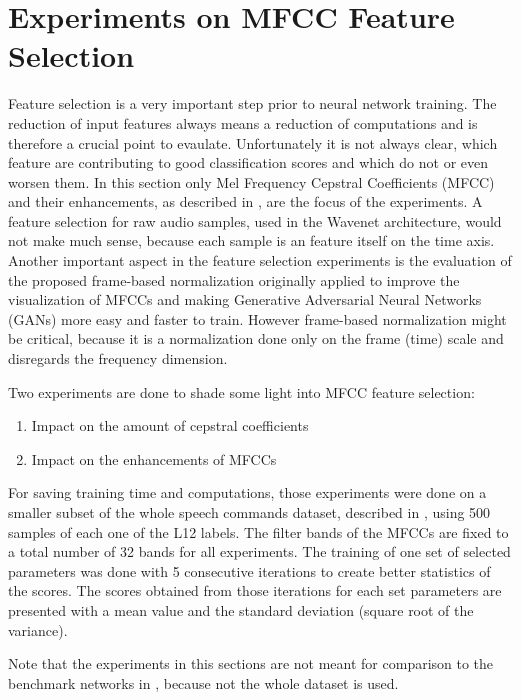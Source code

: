
\section{Experiments on MFCC Feature Selection}\label{sec:exp_fs}
\thesisStateNotReady
Feature selection is a very important step prior to neural network training.
The reduction of input features always means a reduction of computations and is therefore a crucial point to evaulate.
Unfortunately it is not always clear, which feature are contributing to good classification scores and which do not or even worsen them.
In this section only Mel Frequency Cepstral Coefficients (MFCC) and their enhancements, as described in , are the focus of the experiments.
A feature selection for raw audio samples, used in the Wavenet architecture, would not make much sense, because each sample is an feature itself on the time axis.
Another important aspect in the feature selection experiments is the evaluation of the proposed frame-based normalization  originally applied to improve the visualization of MFCCs and making Generative Adversarial Neural Networks (GANs) more easy and faster to train.
However frame-based normalization might be critical, because it is a normalization done only on the frame (time) scale and disregards the frequency dimension.

Two experiments are done to shade some light into MFCC feature selection:
\begin{enumerate}
    \item Impact on the amount of cepstral coefficients
    \item Impact on the enhancements of MFCCs
\end{enumerate}
For saving training time and computations, those experiments were done on a smaller subset of the whole speech commands dataset, described in , using 500 samples of each one of the L12 labels.
The filter bands of the MFCCs are fixed to a total number of 32 bands for all experiments.
The training of one set of selected parameters was done with 5 consecutive iterations to create better statistics of the scores.
The scores obtained from those iterations for each set parameters are presented with a mean value and the standard deviation (square root of the variance).

Note that the experiments in this sections are not meant for comparison to the benchmark networks in , because not the whole dataset is used.


